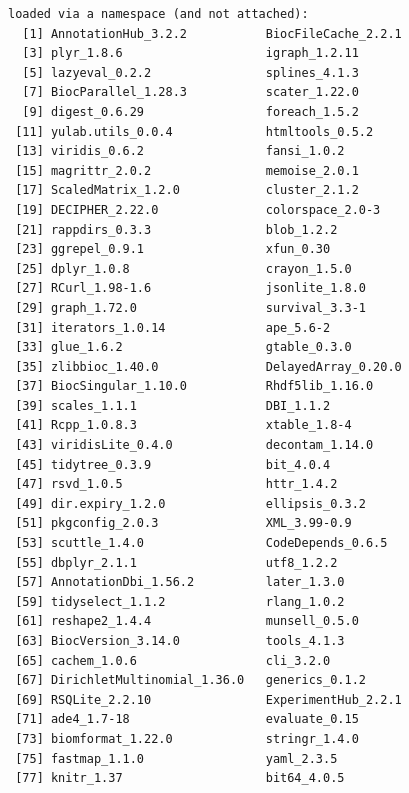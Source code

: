 \documentclass[
]{book}
\begin{document}
\begin{verbatim}
loaded via a namespace (and not attached):
  [1] AnnotationHub_3.2.2           BiocFileCache_2.2.1          
  [3] plyr_1.8.6                    igraph_1.2.11                
  [5] lazyeval_0.2.2                splines_4.1.3                
  [7] BiocParallel_1.28.3           scater_1.22.0                
  [9] digest_0.6.29                 foreach_1.5.2                
 [11] yulab.utils_0.0.4             htmltools_0.5.2              
 [13] viridis_0.6.2                 fansi_1.0.2                  
 [15] magrittr_2.0.2                memoise_2.0.1                
 [17] ScaledMatrix_1.2.0            cluster_2.1.2                
 [19] DECIPHER_2.22.0               colorspace_2.0-3             
 [21] rappdirs_0.3.3                blob_1.2.2                   
 [23] ggrepel_0.9.1                 xfun_0.30                    
 [25] dplyr_1.0.8                   crayon_1.5.0                 
 [27] RCurl_1.98-1.6                jsonlite_1.8.0               
 [29] graph_1.72.0                  survival_3.3-1               
 [31] iterators_1.0.14              ape_5.6-2                    
 [33] glue_1.6.2                    gtable_0.3.0                 
 [35] zlibbioc_1.40.0               DelayedArray_0.20.0          
 [37] BiocSingular_1.10.0           Rhdf5lib_1.16.0              
 [39] scales_1.1.1                  DBI_1.1.2                    
 [41] Rcpp_1.0.8.3                  xtable_1.8-4                 
 [43] viridisLite_0.4.0             decontam_1.14.0              
 [45] tidytree_0.3.9                bit_4.0.4                    
 [47] rsvd_1.0.5                    httr_1.4.2                   
 [49] dir.expiry_1.2.0              ellipsis_0.3.2               
 [51] pkgconfig_2.0.3               XML_3.99-0.9                 
 [53] scuttle_1.4.0                 CodeDepends_0.6.5            
 [55] dbplyr_2.1.1                  utf8_1.2.2                   
 [57] AnnotationDbi_1.56.2          later_1.3.0                  
 [59] tidyselect_1.1.2              rlang_1.0.2                  
 [61] reshape2_1.4.4                munsell_0.5.0                
 [63] BiocVersion_3.14.0            tools_4.1.3                  
 [65] cachem_1.0.6                  cli_3.2.0                    
 [67] DirichletMultinomial_1.36.0   generics_0.1.2               
 [69] RSQLite_2.2.10                ExperimentHub_2.2.1          
 [71] ade4_1.7-18                   evaluate_0.15                
 [73] biomformat_1.22.0             stringr_1.4.0                
 [75] fastmap_1.1.0                 yaml_2.3.5                   
 [77] knitr_1.37                    bit64_4.0.5                  

\end{verbatim}
\end{document}
